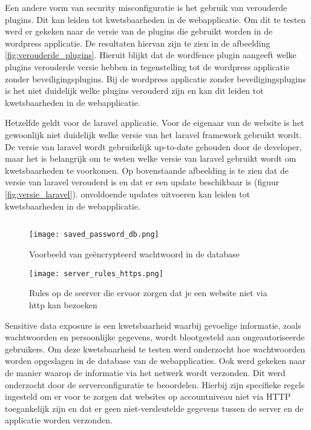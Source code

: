 Een andere vorm van security misconfiguratie is het gebruik van verouderde plugins. Dit kan leiden tot kwetsbaarheden in 
de webapplicatie. Om dit te testen werd er gekeken naar de versie van de plugins die gebruikt worden in de wordpress 
applicatie. De resultaten hiervan zijn te zien in de afbeelding \ref{fig:verouderde_plugins}. Hieruit blijkt dat de wordfence 
plugin aangeeft welke plugins verouderde versie hebben in tegenstelling tot de wordpress applicatie zonder beveiligingsplugins. 
Bij de wordpress applicatie zonder beveiligingsplugins is het niet duidelijk welke plugins verouderd zijn en kan dit leiden 
tot kwetsbaarheden in de webapplicatie.

Hetzelfde geldt voor de laravel applicatie. Voor de eigenaar van de website is het gewoonlijk niet duidelijk welke versie van 
het laravel framework gebruikt wordt. De versie van laravel wordt gebruikelijk up-to-date gehouden door de developer, maar het is 
belangrijk om te weten welke versie van laravel gebruikt wordt om kwetsbaarheden te voorkomen. Op bovenstaande afbeelding is 
te zien dat de versie van laravel verouderd is en dat er een update beschikbaar is (figuur \ref{fig:versie_laravel}). 
onvoldoende updates uitvoeren kan leiden tot kwetsbaarheden in de webapplicatie. 


\subsection{}
\begin{figure}
    \centering
    \texttt{[image: saved\_password\_db.png]}
    \caption[Voorbeeld van geëncrypteerd wachtwoord in de database]{Voorbeeld van geëncrypteerd wachtwoord in de database}
    \label{fig:saved_password_db}
\end{figure}
\begin{figure}
    \centering
    \texttt{[image: server\_rules\_https.png]}
    \caption[Rules op de seerver die ervoor zorgen dat je een website niet via http kan bezoeken]{Rules op de seerver die ervoor zorgen dat je een website niet via http kan bezoeken}
    \label{fig:server_rules}
\end{figure}
Sensitive data exposure is een kwetsbaarheid waarbij gevoelige informatie, zoals wachtwoorden en persoonlijke gegevens, wordt 
blootgesteld aan ongeautoriseerde gebruikers. Om deze kwetsbaarheid te testen werd onderzocht hoe wachtwoorden worden 
opgeslagen in de database van de webapplicaties. Ook werd gekeken naar de manier waarop de informatie via het netwerk wordt 
verzonden. Dit werd onderzocht door de serverconfiguratie te beoordelen. Hierbij zijn specifieke regels ingesteld om er voor 
te zorgen dat websites op accountniveau niet via HTTP toegankelijk zijn en dat er geen niet-versleutelde gegevens tussen de 
server en de applicatie worden verzonden.

